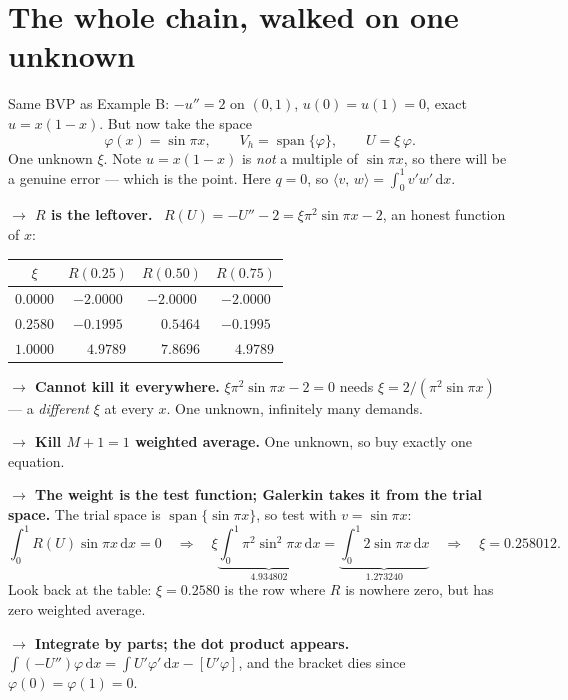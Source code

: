 \documentclass[11pt]{article}
\newcommand{\dx}{\,\mathrm{d}x}
\newcommand{\ip}[2]{\bigl\langle #1,\,#2\bigr\rangle}
\newcommand{\Vh}{V_{h}}
\begin{document}
\section{The whole chain, walked on one unknown}\label{sec:chainex}

\begin{worked}
Same BVP as Example B: $-u''=2$ on $(0,1)$, $u(0)=u(1)=0$, exact $u=x(1-x)$.
But now take the space
\[
  \varphi(x)=\sin\pi x,\qquad \Vh=\operatorname{span}\{\varphi\},
  \qquad U=\xi\,\varphi .
\]
One unknown $\xi$. Note $u=x(1-x)$ is \emph{not} a multiple of $\sin\pi x$, so
there will be a genuine error --- which is the point. Here $q=0$, so
$\ip{v}{w}=\int_0^1 v'w'\dx$.

\medskip
\textbf{$\rightarrow$ $R$ is the leftover.}
\ $R(U)=-U''-2=\xi\pi^{2}\sin\pi x-2$, an honest function of $x$:
\begin{center}\small
\begin{tabular}{@{}cccc@{}}
\toprule
$\xi$ & $R(0.25)$ & $R(0.50)$ & $R(0.75)$ \\
\midrule
$0.0000$ & $-2.0000$ & $-2.0000$ & $-2.0000$ \\
$0.2580$ & $-0.1995$ & $\phantom{-}0.5464$ & $-0.1995$ \\
$1.0000$ & $\phantom{-}4.9789$ & $\phantom{-}7.8696$ & $\phantom{-}4.9789$ \\
\bottomrule
\end{tabular}
\end{center}

\textbf{$\rightarrow$ Cannot kill it everywhere.}
$\xi\pi^{2}\sin\pi x-2=0$ needs $\xi=2/(\pi^{2}\sin\pi x)$ --- a \emph{different}
$\xi$ at every $x$. One unknown, infinitely many demands.

\textbf{$\rightarrow$ Kill $M+1=1$ weighted average.} One unknown, so buy
exactly one equation.

\textbf{$\rightarrow$ The weight is the test function; Galerkin takes it from
the trial space.} The trial space is $\operatorname{span}\{\sin\pi x\}$, so test
with $v=\sin\pi x$:
\[
  \int_0^1 R(U)\sin\pi x\dx=0
  \quad\Longrightarrow\quad
  \xi\underbrace{\int_0^1\pi^{2}\sin^{2}\pi x\dx}_{4.934802}
   =\underbrace{\int_0^1 2\sin\pi x\dx}_{1.273240}
  \quad\Longrightarrow\quad \xi=0.258012 .
\]
Look back at the table: $\xi=0.2580$ is the row where $R$ is nowhere zero, but
has zero weighted average.

\textbf{$\rightarrow$ Integrate by parts; the dot product appears.}
$\int(-U'')\varphi\dx=\int U'\varphi'\dx-[U'\varphi]$, and the bracket dies
since $\varphi(0)=\varphi(1)=0$.


\end{worked}
\end{document}
